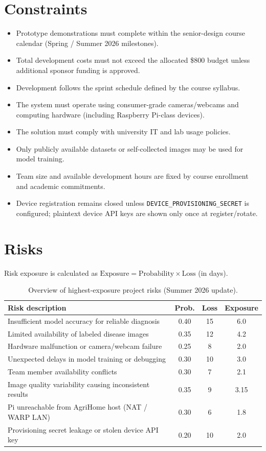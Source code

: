 \documentclass[11pt,letterpaper]{article}
\begin{document}
\section{Constraints}
\begin{itemize}
  \item Prototype demonstrations must complete within the senior-design course calendar (Spring /
        Summer 2026 milestones).
  \item Total development costs must not exceed the allocated \$800 budget unless additional sponsor
        funding is approved.
  \item Development follows the sprint schedule defined by the course syllabus.
  \item The system must operate using consumer-grade cameras/webcams and computing hardware
        (including Raspberry Pi-class devices).
  \item The solution must comply with university IT and lab usage policies.
  \item Only publicly available datasets or self-collected images may be used for model training.
  \item Team size and available development hours are fixed by course enrollment and academic
        commitments.
  \item Device registration remains closed unless \texttt{DEVICE\_PROVISIONING\_SECRET} is configured;
        plaintext device API keys are shown only once at register/rotate.
\end{itemize}

\section{Risks}
Risk exposure is calculated as $\mathrm{Exposure} = \mathrm{Probability} \times \mathrm{Loss}$ (in days).

\begin{table}[H]
\centering
\begin{tabular}{@{}p{6.2cm}ccc@{}}
\toprule
\textbf{Risk description} & \textbf{Prob.} & \textbf{Loss} & \textbf{Exposure} \\
\midrule
Insufficient model accuracy for reliable diagnosis & 0.40 & 15 & 6.0 \\
Limited availability of labeled disease images & 0.35 & 12 & 4.2 \\
Hardware malfunction or camera/webcam failure & 0.25 & 8 & 2.0 \\
Unexpected delays in model training or debugging & 0.30 & 10 & 3.0 \\
Team member availability conflicts & 0.30 & 7 & 2.1 \\
Image quality variability causing inconsistent results & 0.35 & 9 & 3.15 \\
Pi unreachable from AgriHome host (NAT / WARP LAN) & 0.30 & 6 & 1.8 \\
Provisioning secret leakage or stolen device API key & 0.20 & 10 & 2.0 \\
\bottomrule
\end{tabular}
\caption{Overview of highest-exposure project risks (Summer 2026 update).}
\label{tab:risks}
\end{table}
\end{document}
